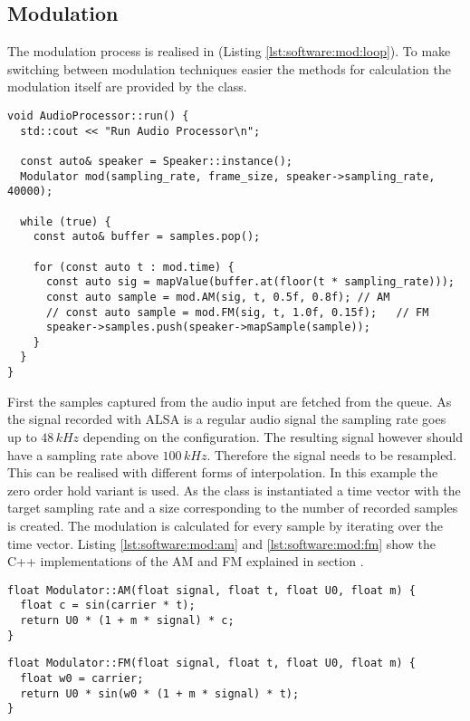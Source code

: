 \subsection{Modulation}
%
The modulation process is realised in  (Listing \ref{lst:software:mod:loop}). To make switching between modulation techniques easier the methods for calculation the modulation itself are provided by the  class.\p
%
\begin{mdframed}
\begin{lstlisting}[caption=Audio processing loop, label=lst:software:mod:loop]
void AudioProcessor::run() {
  std::cout << "Run Audio Processor\n";

  const auto& speaker = Speaker::instance();
  Modulator mod(sampling_rate, frame_size, speaker->sampling_rate, 40000);

  while (true) {
    const auto& buffer = samples.pop();

    for (const auto t : mod.time) {
      const auto sig = mapValue(buffer.at(floor(t * sampling_rate)));
      const auto sample = mod.AM(sig, t, 0.5f, 0.8f); // AM
      // const auto sample = mod.FM(sig, t, 1.0f, 0.15f);   // FM
      speaker->samples.push(speaker->mapSample(sample));
    }
  }
}
\end{lstlisting}
\end{mdframed}
%
First the samples captured from the audio input are fetched from the  queue. As the signal recorded with ALSA is a regular audio signal the sampling rate goes up to $48\,kHz$ depending on the configuration. The resulting signal however should have a sampling rate above $100\,kHz$. Therefore the signal needs to be resampled. This can be realised with different forms of interpolation. In this example the zero order hold variant is used.\p
%
As the  class is instantiated a time vector with the target sampling rate and a size corresponding to the number of recorded samples is created. The modulation is calculated for every sample by iterating over the time vector.\p
%
Listing \ref{lst:software:mod:am} and \ref{lst:software:mod:fm} show the C++ implementations of the AM and FM explained in section .
%
\begin{mdframed}
\begin{lstlisting}[caption=Amplitude modulation, label=lst:software:mod:am]
float Modulator::AM(float signal, float t, float U0, float m) {
  float c = sin(carrier * t);
  return U0 * (1 + m * signal) * c;
}
\end{lstlisting}
\end{mdframed}
%
\begin{mdframed}
\begin{lstlisting}[caption=Frequency modulation, label=lst:software:mod:fm]
float Modulator::FM(float signal, float t, float U0, float m) {
  float w0 = carrier;
  return U0 * sin(w0 * (1 + m * signal) * t);
}
\end{lstlisting}
\end{mdframed}
